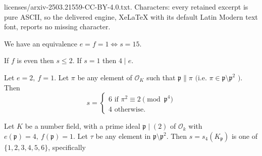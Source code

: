 \documentclass[10pt,a4paper]{amsart}
\newcommand{\OO}{\mathcal{O}}
\newcommand{\p}{\mathfrak{p}}
\begin{document}
licenses/arxiv-2503.21559-CC-BY-4.0.txt. Characters: every retained excerpt is pure ASCII, so the delivered engine, XeLaTeX with its default Latin Modern text font, reports no missing character.
\begin{thm}\label{1.1} 
We have an equivalence  $e=f=1 \iff s=15$. 
\end{thm}

\begin{thm}\label{1.2} 
 If $f$ is even then $s \leq 2$. If $s=1$ then $4 \mid e$. 

\end{thm}

\begin{thm}\label{1.3} 
 Let $e=2,\ f=1$. Let $\pi$ be any element of $\mathcal{O}_K $ such that $\mathfrak{p} \parallel \pi$ $($i.e. $\pi \in \mathfrak{p} \setminus \mathfrak{p}^2$ $)$. \\
Then $$s = \begin{cases}
    6 \text{ if } \pi^2 \equiv 2 \pmod{\mathfrak{p}^4}\\
    4 \text{ otherwise.}
\end{cases} $$
\end{thm}

\begin{thm}\label{main}
Let $K$ be a number field, with a prime ideal $\p \mid (2)$ of $\OO_k$ with $e(\p) = 4, \ f(\p)=1$. Let $\tau$ be any element in $\mathfrak{p}\setminus \mathfrak{p}^2$. Then $s = s_4(K_{\mathfrak{p}})$ is one of $\{1,2,3,4,5,6\}$, specifically
\end{thm}
\end{document}
